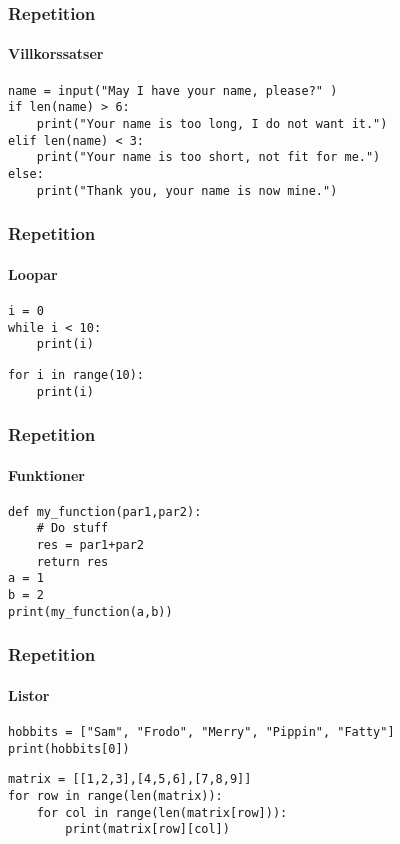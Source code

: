\documentclass[aspectratio=169]{beamer}
\begin{document}
\begin{frame}[fragile]
   \frametitle{Repetition}
   \framesubtitle{Villkorssatser}

    
    \begin{lstlisting}
name = input("May I have your name, please?" )
if len(name) > 6:
    print("Your name is too long, I do not want it.")
elif len(name) < 3:
    print("Your name is too short, not fit for me.")
else:
    print("Thank you, your name is now mine.")
    \end{lstlisting}

\end{frame}

\begin{frame}[fragile]
    \frametitle{Repetition}
    \framesubtitle{Loopar}


    \begin{lstlisting}
i = 0
while i < 10:
    print(i)
    \end{lstlisting}

    \begin{lstlisting}
for i in range(10):
    print(i)
    \end{lstlisting}

\end{frame}

\begin{frame}[fragile]
    \frametitle{Repetition}
    \framesubtitle{Funktioner}


    \begin{lstlisting}
def my_function(par1,par2):
    # Do stuff
    res = par1+par2
    return res
a = 1
b = 2
print(my_function(a,b))
    \end{lstlisting}

\end{frame}

\begin{frame}[fragile]
    \frametitle{Repetition}
    \framesubtitle{Listor}


    \begin{lstlisting}
hobbits = ["Sam", "Frodo", "Merry", "Pippin", "Fatty"]
print(hobbits[0])
    \end{lstlisting}

    \begin{lstlisting}
matrix = [[1,2,3],[4,5,6],[7,8,9]]
for row in range(len(matrix)):
    for col in range(len(matrix[row])):
        print(matrix[row][col])
    \end{lstlisting}

\end{frame}
\end{document}
